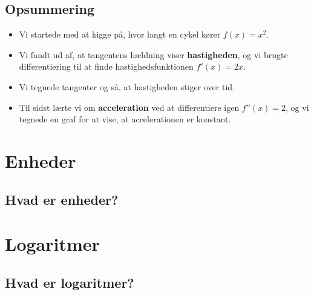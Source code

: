\documentclass[
  letterpaper,
  DIV=11,
  numbers=noendperiod]{scrreprt}
\providecommand{\tightlist}{%
  \setlength{\itemsep}{0pt}\setlength{\parskip}{0pt}}\usepackage{longtable,booktabs,array}
\begin{document}
\section{Opsummering}\label{opsummering}

\begin{itemize}
\tightlist
\item
  Vi startede med at kigge på, hvor langt en cykel kører \(f(x) = x^2\).
\item
  Vi fandt ud af, at tangentens hældning viser \textbf{hastigheden}, og
  vi brugte differentiering til at finde hastighedsfunktionen
  \(f'(x) = 2x\).
\item
  Vi tegnede tangenter og så, at hastigheden stiger over tid.
\item
  Til sidst lærte vi om \textbf{acceleration} ved at differentiere igen
  \(f''(x) = 2\), og vi tegnede en graf for at vise, at accelerationen
  er konstant.
\end{itemize}


\chapter{Enheder}\label{enheder}

\section{Hvad er enheder?}\label{hvad-er-enheder}


\chapter{Logaritmer}\label{logaritmer}

\section{Hvad er logaritmer?}\label{hvad-er-logaritmer}
\end{document}
